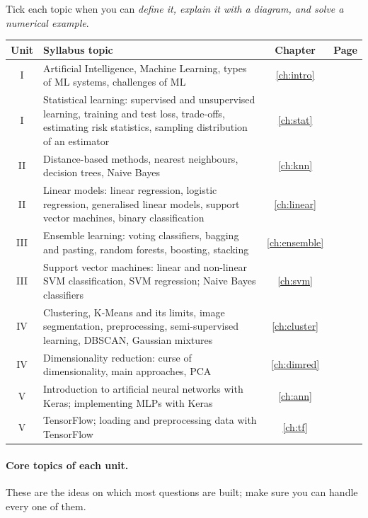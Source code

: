 Tick each topic when you can \emph{define it, explain it with a diagram, and solve a numerical example}.

\begin{center}
\small
\begin{tabular}{@{}c p{8.8cm} c c@{}}
\toprule
\textbf{Unit} & \textbf{Syllabus topic} & \textbf{Chapter} & \textbf{Page}\\
\midrule
I & Artificial Intelligence, Machine Learning, types of ML systems, challenges of ML & \ref{ch:intro} & \pageref{ch:intro}\\
I & Statistical learning: supervised and unsupervised learning, training and test loss, trade-offs, estimating risk statistics, sampling distribution of an estimator & \ref{ch:stat} & \pageref{ch:stat}\\
\midrule
II & Distance-based methods, nearest neighbours, decision trees, Naive Bayes & \ref{ch:knn} & \pageref{ch:knn}\\
II & Linear models: linear regression, logistic regression, generalised linear models, support vector machines, binary classification & \ref{ch:linear} & \pageref{ch:linear}\\
\midrule
III & Ensemble learning: voting classifiers, bagging and pasting, random forests, boosting, stacking & \ref{ch:ensemble} & \pageref{ch:ensemble}\\
III & Support vector machines: linear and non-linear SVM classification, SVM regression; Naive Bayes classifiers & \ref{ch:svm} & \pageref{ch:svm}\\
\midrule
IV & Clustering, K-Means and its limits, image segmentation, preprocessing, semi-supervised learning, DBSCAN, Gaussian mixtures & \ref{ch:cluster} & \pageref{ch:cluster}\\
IV & Dimensionality reduction: curse of dimensionality, main approaches, PCA & \ref{ch:dimred} & \pageref{ch:dimred}\\
\midrule
V & Introduction to artificial neural networks with Keras; implementing MLPs with Keras & \ref{ch:ann} & \pageref{ch:ann}\\
V & TensorFlow; loading and preprocessing data with TensorFlow & \ref{ch:tf} & \pageref{ch:tf}\\
\bottomrule
\end{tabular}
\end{center}

\paragraph{Core topics of each unit.} These are the ideas on which most questions are built; make sure you can handle every one of them.

